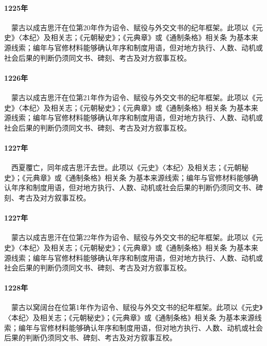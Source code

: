\paragraph{1225年}　蒙古以成吉思汗在位第20年作为诏令、赋役与外交文书的纪年框架。此项以《元史》〈本纪〉及相关志；《元朝秘史》；《元典章》或《通制条格》相关条 为基本来源线索；编年与官修材料能够确认年序和制度用语，但对地方执行、人数、动机或社会后果的判断仍须同文书、碑刻、考古及对方叙事互校。

\paragraph{1226年}　蒙古以成吉思汗在位第21年作为诏令、赋役与外交文书的纪年框架。此项以《元史》〈本纪〉及相关志；《元朝秘史》；《元典章》或《通制条格》相关条 为基本来源线索；编年与官修材料能够确认年序和制度用语，但对地方执行、人数、动机或社会后果的判断仍须同文书、碑刻、考古及对方叙事互校。

\paragraph{1227年}　西夏覆亡，同年成吉思汗去世。此项以《元史》〈本纪〉及相关志；《元朝秘史》；《元典章》或《通制条格》相关条 为基本来源线索；编年与官修材料能够确认年序和制度用语，但对地方执行、人数、动机或社会后果的判断仍须同文书、碑刻、考古及对方叙事互校。

\paragraph{1227年}　蒙古以成吉思汗在位第22年作为诏令、赋役与外交文书的纪年框架。此项以《元史》〈本纪〉及相关志；《元朝秘史》；《元典章》或《通制条格》相关条 为基本来源线索；编年与官修材料能够确认年序和制度用语，但对地方执行、人数、动机或社会后果的判断仍须同文书、碑刻、考古及对方叙事互校。

\paragraph{1228年}　蒙古以窝阔台在位第1年作为诏令、赋役与外交文书的纪年框架。此项以《元史》〈本纪〉及相关志；《元朝秘史》；《元典章》或《通制条格》相关条 为基本来源线索；编年与官修材料能够确认年序和制度用语，但对地方执行、人数、动机或社会后果的判断仍须同文书、碑刻、考古及对方叙事互校。

